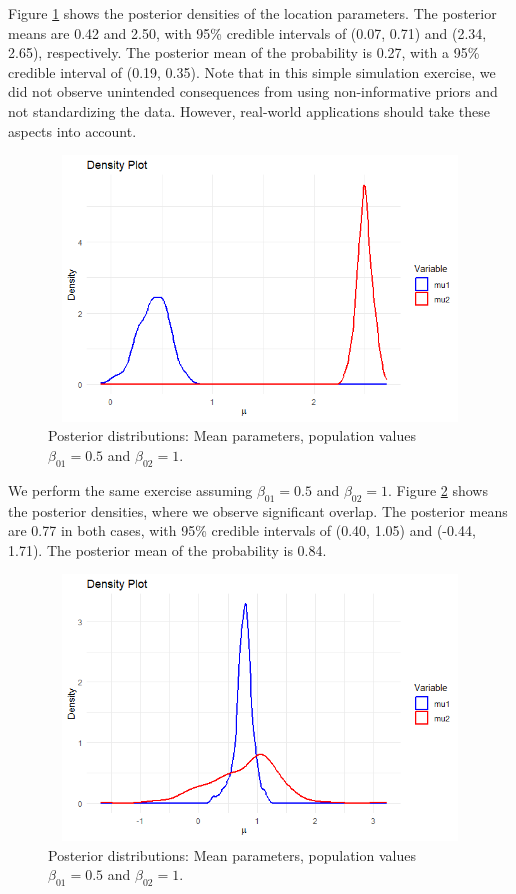 Figure \ref{figMean1} shows the posterior densities of the location parameters. The posterior means are 0.42 and 2.50, with 95\% credible intervals of (0.07, 0.71) and (2.34, 2.65), respectively. The posterior mean of the probability is 0.27, with a 95\% credible interval of (0.19, 0.35). Note that in this simple simulation exercise, we did not observe unintended consequences from using non-informative priors and not standardizing the data. However, real-world applications should take these aspects into account. 

\begin{figure}[!h]
	\includegraphics[width=340pt, height=200pt]{Chapters/chapter11/figures/Sim1LSI.png}
	\caption[List of figure caption goes here]{Posterior distributions: Mean parameters, population values $\beta_{01}=0.5$ and $\beta_{02}=1$.}\label{figMean1}
\end{figure}

We perform the same exercise assuming $\beta_{01}=0.5$ and $\beta_{02}=1$. Figure \ref{figMean2} shows the posterior densities, where we observe significant overlap. The posterior means are 0.77 in both cases, with 95\% credible intervals of (0.40, 1.05) and (-0.44, 1.71). The posterior mean of the probability is 0.84. 
 
\begin{figure}[!h]
	\includegraphics[width=340pt, height=200pt]{Chapters/chapter11/figures/Sim2LSI.png}
	\caption[List of figure caption goes here]{Posterior distributions: Mean parameters, population values $\beta_{01}=0.5$ and $\beta_{02}=1$.}\label{figMean2}
\end{figure}

